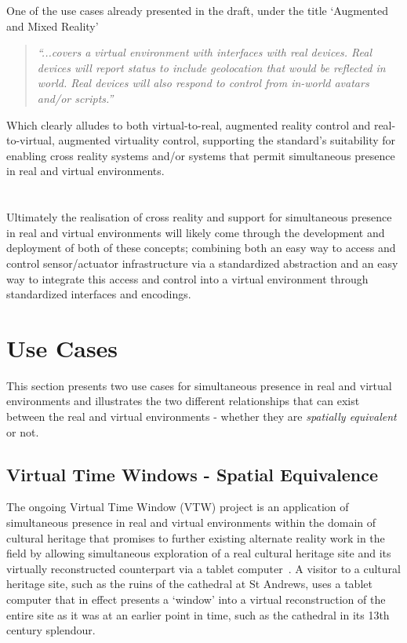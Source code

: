 One of the use cases already presented in the draft, under the title `Augmented and Mixed Reality'

\begin{quote}
\textit{``...covers a virtual environment with interfaces with real devices. Real devices will report status to include geolocation that would be reflected in world. Real devices will also respond to control from in-world avatars and/or scripts.''}
\end{quote}

Which clearly alludes to both virtual-to-real, augmented reality control and real-to-virtual, augmented virtuality control, supporting the standard's suitability for enabling cross reality systems and/or systems that permit simultaneous presence in real and virtual environments.
\\
\\
\\
Ultimately the realisation of cross reality and support for simultaneous presence in real and virtual environments will likely come through the development and deployment of both of these concepts; combining both an easy way to access and control sensor/actuator infrastructure via a standardized abstraction and an easy way to integrate this access and control into a virtual environment through standardized interfaces and encodings.

\section{Use Cases}
This section presents two use cases for simultaneous presence in real and virtual environments and illustrates the two different relationships that can exist between the real and virtual environments - whether they are \textit{spatially equivalent} or not.

\subsection{Virtual Time Windows - Spatial Equivalence}
\label{subsec:vtw}
The ongoing Virtual Time Window (VTW) project is an application of simultaneous presence in real and virtual environments within the domain of cultural heritage that promises to further existing alternate reality work in the field by allowing simultaneous exploration of a real cultural heritage site and its virtually reconstructed counterpart via a tablet computer~\cite{Davies2012}. A visitor to a cultural heritage site, such as the ruins of the cathedral at St Andrews, uses a tablet computer that in effect presents a `window' into a virtual reconstruction of the entire site as it was at an earlier point in time, such as the cathedral in its 13th century splendour.

